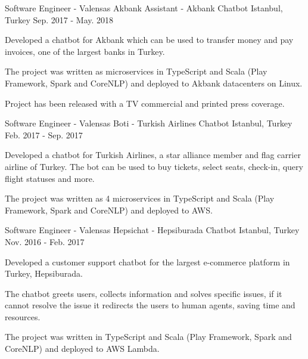 \begin{cventries}
  \cventry
    {Software Engineer - Valensas}
    {Akbank Assistant - Akbank Chatbot}
    {Istanbul, Turkey}
    {Sep. 2017 - May. 2018}
    {
      \begin{cvitems}
        \item {Developed a chatbot for Akbank which can be used to transfer money and pay invoices, one of the largest banks in Turkey.}
        \item {The project was written as microservices in TypeScript and Scala (Play Framework, Spark and CoreNLP) and deployed to Akbank datacenters on Linux.}
        \item {Project has been released with a TV commercial and printed press coverage.}
      \end{cvitems}
    }

  \cventry
    {Software Engineer - Valensas}
    {Boti - Turkish Airlines Chatbot}
    {Istanbul, Turkey}
    {Feb. 2017 - Sep. 2017}
    {
      \begin{cvitems}
        \item {Developed a chatbot for Turkish Airlines, a star alliance member and flag carrier airline of Turkey. The bot can be used to buy tickets, select seats, check-in, query flight statuses and more.}
        \item {The project was written as 4 microservices in TypeScript and Scala (Play Framework, Spark and CoreNLP) and deployed to AWS.}
      \end{cvitems}
    }

  \cventry
    {Software Engineer - Valensas}
    {Hepsichat - Hepsiburada Chatbot}
    {Istanbul, Turkey}
    {Nov. 2016 - Feb. 2017}
    {
      \begin{cvitems}
        \item {Developed a customer support chatbot for the largest e-commerce platform in Turkey, Hepsiburada.}
        \item {The chatbot greets users, collects information and solves specific issues, if it cannot resolve the issue it redirects the users to human agents, saving time and resources.}
        \item {The project was written in TypeScript and Scala (Play Framework, Spark and CoreNLP) and deployed to AWS Lambda.}
      \end{cvitems}
    }


\end{cventries}
